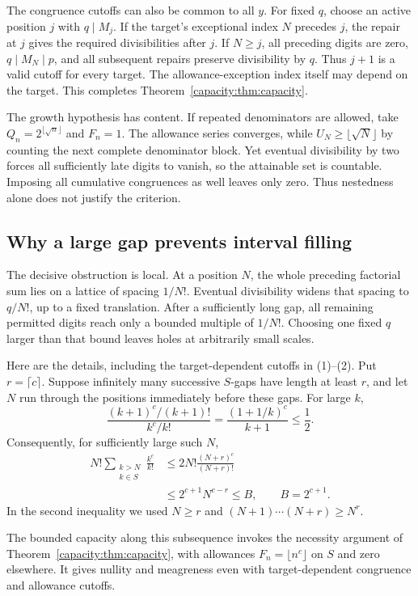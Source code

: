 \documentclass[11pt]{article}
\begin{document}
The congruence cutoffs can also be common to all $y$. For fixed $q$, choose
an active position $j$ with $q\mid M_j$. If the target's exceptional index
$N$ precedes $j$, the repair at $j$ gives the required divisibilities after
$j$. If $N\ge j$, all preceding digits are zero, $q\mid M_N\mid p$, and
all subsequent repairs preserve divisibility by $q$. Thus $j+1$ is a valid
cutoff for every target. The allowance-exception index itself may depend
on the target. This completes Theorem~\ref{capacity:thm:capacity}.

The growth hypothesis has content. If repeated denominators are allowed,
take $Q_n=2^{\lfloor\sqrt n\rfloor}$ and $F_n=1$. The allowance series
converges, while $U_N\ge\lfloor\sqrt N\rfloor$ by counting the next complete
denominator block. Yet eventual divisibility by two forces all sufficiently
late digits to vanish, so the attainable set is countable. Imposing all
cumulative congruences as well leaves only zero. Thus nestedness alone does
not justify the criterion.

\subsection{Why a large gap prevents interval filling}\label{capacity:sec:negative}
The decisive obstruction is local. At a position $N$, the whole preceding
factorial sum lies on a lattice of spacing $1/N!$. Eventual divisibility
widens that spacing to $q/N!$, up to a fixed translation. After a sufficiently
long gap, all remaining permitted digits reach only a bounded multiple of
$1/N!$. Choosing one fixed $q$ larger than that bound leaves holes at
arbitrarily small scales.

Here are the details, including the target-dependent cutoffs in (1)--(2).
Put $r=\lceil c\rceil$. Suppose infinitely many successive $S$-gaps have
length at least $r$, and let $N$ run through the positions immediately before
these gaps. For large $k$,
\[
 \frac{(k+1)^c/(k+1)!}{k^c/k!}
 =\frac{(1+1/k)^c}{k+1}\le\frac12.
\]
Consequently, for sufficiently large such $N$,
\begin{align}
 N!\sum_{\substack{k>N\\k\in S}}\frac{k^c}{k!}
 &\le 2N!\frac{(N+r)^c}{(N+r)!}\\
 &\le 2^{c+1}N^{c-r}\le B,\qquad B=2^{c+1}.
 \tag{5}\label{capacity:eq:tailbound}
\end{align}
In the second inequality we used $N\ge r$ and
$(N+1)\cdots(N+r)\ge N^r$.

The bounded capacity along this subsequence invokes the necessity argument
of Theorem~\ref{capacity:thm:capacity}, with allowances
$F_n=\lfloor n^c\rfloor$ on $S$ and zero elsewhere. It gives nullity and
meagreness even with target-dependent congruence and allowance cutoffs.
\end{document}
